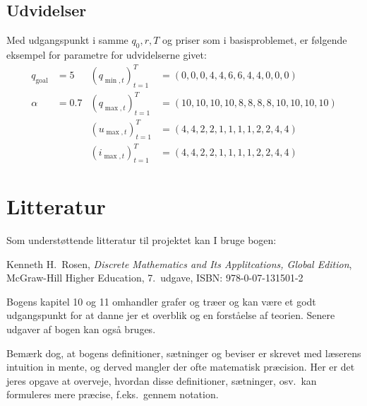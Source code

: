 \documentclass[12pt,a4paper,oneside,final]{article}
\begin{document}
\subsection{Udvidelser}
Med udgangspunkt i samme \(q_{0}, r, T\) og priser som i basisproblemet, er følgende eksempel for parametre for udvidelserne givet:
\begin{align*}
  q_{\mathrm{goal}} & = 5   & (q_{\min,t})_{t=1}^{T} & = (0, 0, 0, 4, 4, 6, 6, 4, 4, 0, 0, 0)          \\
  \alpha            & = 0.7 & (q_{\max,t})_{t=1}^{T} & = (10, 10, 10, 10, 8, 8, 8, 8, 10, 10, 10, 10)  \\
                    &       & (u_{\max,t})_{t=1}^{T} & = (4, 4, 2, 2, 1, 1, 1, 1, 2, 2, 4, 4)          \\
                    &       & (i_{\max,t})_{t=1}^{T} & = (4, 4, 2, 2, 1, 1, 1, 1, 2, 2, 4, 4)
\end{align*}


\section{Litteratur}
Som understøttende litteratur til projektet kan I bruge bogen:
\begin{center}
  Kenneth H.\ Rosen,
  \emph{Discrete Mathematics and Its Applitcations, Global Edition},\\
  McGraw-Hill Higher Education,
  7.\ udgave,
  ISBN: 978-0-07-131501-2
\end{center}
Bogens kapitel 10 og 11 omhandler grafer og træer og kan være et godt udgangspunkt for at danne jer et overblik og en forståelse af teorien.
Senere udgaver af bogen kan også bruges.

Bemærk dog, at bogens definitioner, sætninger og beviser er skrevet med læserens intuition in mente, og derved mangler der ofte  matematisk præcision.
Her er det jeres opgave at overveje, hvordan disse definitioner, sætninger, osv.\ kan formuleres mere præcise, f.eks.\ gennem notation.
\end{document}
